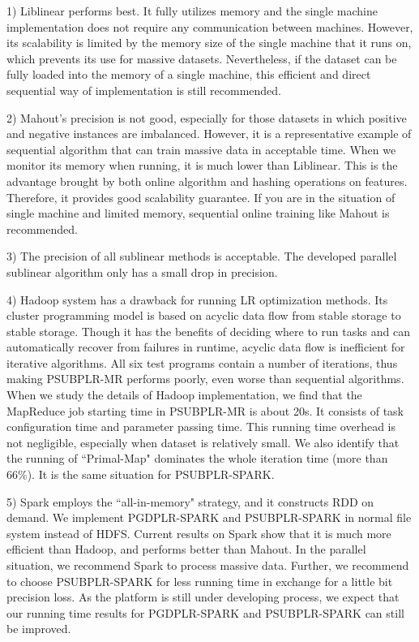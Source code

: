 \documentclass[10pt, conference, compsocconf]{IEEEtran}
\begin{document}
1) Liblinear performs best. It fully utilizes memory and the single machine implementation does not require any communication between machines.
          However, its scalability is limited by the memory size of the single machine that it runs on, which prevents its use for massive datasets.
          Nevertheless, if the dataset can be fully loaded into the memory of a single machine, this efficient and direct sequential way of implementation is still recommended.

2) Mahout's precision is not good, especially for those datasets in which positive and negative instances are imbalanced.
          However, it is a representative example of sequential algorithm that can train massive data in acceptable time.
          When we monitor its memory when running, it is much lower than Liblinear. This is the advantage brought by both online algorithm and hashing operations on features.
          Therefore, it provides good scalability guarantee. If you are in the situation of single machine and limited memory, sequential online training like Mahout is recommended.

3) The precision of all sublinear methods is acceptable. The developed parallel sublinear algorithm only has a small drop in precision.

4) Hadoop system has a drawback for running LR optimization methods. Its cluster programming model is based on acyclic data flow from stable storage to stable storage.
          Though it has the benefits of deciding where to run tasks and can automatically recover from failures in runtime, acyclic data flow is inefficient for iterative algorithms.
          All six test programs contain a number of iterations, thus making PSUBPLR-MR performs poorly, even worse than sequential algorithms.
          When we study the details of Hadoop implementation, we find that the MapReduce job starting time in PSUBPLR-MR is about 20s. It consists of task configuration time and parameter passing time.
          This running time overhead is not negligible, especially when dataset is relatively small.
          We also identify that the running of ``Primal-Map" dominates the whole iteration time (more than 66\%). It is the same situation for PSUBPLR-SPARK.

5) Spark employs the ``all-in-memory" strategy, and it constructs RDD on demand. We implement PGDPLR-SPARK and PSUBPLR-SPARK in normal file system instead of HDFS.
          Current results on Spark show that it is much more efficient than Hadoop, and performs better than Mahout.
          In the parallel situation, we recommend Spark to process massive data. Further, we recommend to choose PSUBPLR-SPARK for less running time in exchange for a little bit precision loss.
          As the platform is still under developing process, we expect that our running time results for PGDPLR-SPARK and PSUBPLR-SPARK can still be improved.
\end{document}
